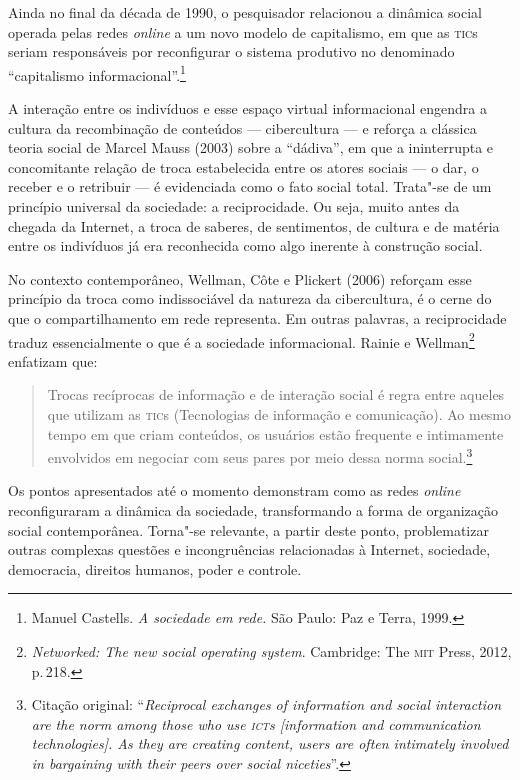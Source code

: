 Ainda no final da década de 1990, o pesquisador relacionou a dinâmica
social operada pelas redes \textit{online} a um novo modelo de capitalismo, em
que as \textsc{tic}s seriam responsáveis por reconfigurar o sistema produtivo no
denominado ``capitalismo informacional''.\footnote{Manuel Castells. \textit{A sociedade em rede.} São Paulo: Paz e Terra, 1999.}

A interação entre os indivíduos e esse espaço virtual informacional
engendra a cultura da recombinação de conteúdos --- cibercultura --- e
reforça a clássica teoria social de Marcel Mauss (2003) sobre a
``dádiva'', em que a ininterrupta e concomitante relação de troca
estabelecida entre os atores sociais --- o dar, o receber e o retribuir
--- é evidenciada como o fato social total. Trata"-se de um princípio
universal da sociedade: a reciprocidade. Ou seja, muito antes da chegada
da Internet, a troca de saberes, de sentimentos, de cultura e de matéria
entre os indivíduos já era reconhecida como algo inerente à construção
social.

No contexto contemporâneo, Wellman, Côte e Plickert (2006) reforçam esse
princípio da troca como indissociável da natureza da cibercultura, é o
cerne do que o compartilhamento em rede representa. Em outras palavras,
a reciprocidade traduz essencialmente o que é a sociedade informacional.
Rainie e Wellman\footnote{\textit{Networked: The new social
operating system}. Cambridge: The \textsc{mit} Press, 2012, p.\,218.} enfatizam que:

\begin{quote}
Trocas recíprocas de informação e de interação social é regra entre
aqueles que utilizam as \textsc{tic}s (Tecnologias de informação e comunicação).
Ao mesmo tempo em que criam conteúdos, os usuários estão frequente e
intimamente envolvidos em negociar com seus pares por meio dessa norma
social.\footnote{Citação original: ``\textit{Reciprocal exchanges of information and social interaction are the norm among those who use \textsc{ict}s {[}information and communication
technologies{]}. As they are creating content, users are often
intimately involved in bargaining with their peers over social
niceties}''.}
\end{quote}

Os pontos apresentados até o momento demonstram como as redes \textit{online}
reconfiguraram a dinâmica da sociedade, transformando a forma de
organização social contemporânea. Torna"-se relevante, a partir deste
ponto, problematizar outras complexas questões e incongruências
relacionadas à Internet, sociedade, democracia, direitos humanos, poder
e controle.

